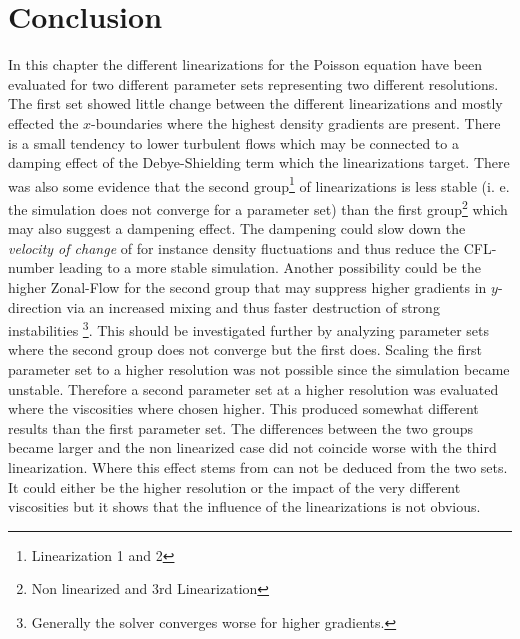 \documentclass[master.tex]{subfiles}
\begin{document}
\section{Conclusion}
In this chapter the different linearizations for the Poisson equation have been evaluated for two different parameter sets representing two different resolutions. The first set showed little change between the different linearizations and mostly effected the $x$-boundaries where the highest density gradients are present. There is a small tendency to lower turbulent flows which may be connected to a damping effect of the Debye-Shielding term which the linearizations target. There was also some evidence that the second group\footnote{Linearization 1 and 2} of linearizations is less stable (i. e. the simulation does not converge for a parameter set) than the first group\footnote{Non linearized and 3rd Linearization} which may also suggest a dampening effect. The dampening could slow down the \textit{velocity of change} of for instance density fluctuations and thus reduce the \ac{CFL}-number leading to a more stable simulation. Another possibility could be the higher Zonal-Flow for the second group that may suppress higher gradients in $y$-direction via an increased mixing and thus faster destruction of strong instabilities \footnote{Generally the solver converges worse for higher gradients.}. This should be investigated further by analyzing parameter sets where the second group does not converge but the first does.
Scaling the first parameter set to a higher resolution was not possible since the simulation became unstable. Therefore a second parameter set at a higher resolution was evaluated where the viscosities where chosen higher. This produced somewhat different results than the first parameter set. The differences between the two groups became larger and the non linearized case did not coincide worse with the third linearization. Where this effect stems from can not be deduced from the two sets. It could either be the higher resolution or the impact of the very different viscosities but it shows that the influence of the linearizations is not obvious.\newline
\end{document}
